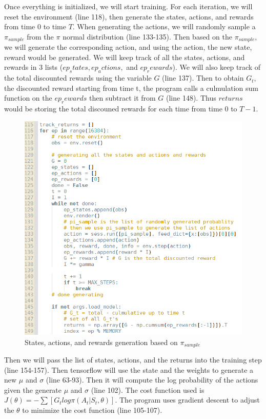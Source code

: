 \documentclass[11pt,twoside]{article}
\begin{document}
Once everything is initialized, we will start training. For each iteration, we will reset the environment (line 118), then generate the states, actions, and rewards from time 0 to time $T$. When generating the actions, we will randomly sample a $\pi_{sample}$ from the $\pi$ normal distribution (line 133-135). Then based on the $\pi_{sample}$, we will generate the corresponding action, and using the action, the new state, reward would be generated. We will keep track of all the states, actions, and rewards in 3 lists ($ep_states, ep_actions, $ and $ep_rewards$). We will also keep track of the total discounted rewards using the variable $G$ (line 137). Then to obtain $G_t$, the discounted reward starting from time t, the program calls a culmulation sum function on the $ep_rewards$ then subtract it from $G$ (line 148). Thus $returns$ would be storing the total discouned rewards for each time from time 0 to $T-1$.

\begin{figure}[h]
	\centering
	\includegraphics[scale=0.8]{part1_generate.png}
	\caption*{States, actions, and rewards generation based on $\pi_{sample}$}
\end{figure}

Then we will pass the list of states, actions, and the returns into the training step (line 154-157). Then tensorflow will use the state and the weights to generate a new $\mu$ and $\sigma$ (line 63-93). Then it will compute the log probability of the actions given the generate $\mu$ and $\sigma$ (line 102). The cost function used is $J(\theta) = -\sum[G_t log \pi (A_t | S_t, \theta)]$. The program uses gradient descent to adjust the $\theta$ to minimize the cost function (line 105-107).
\end{document}
